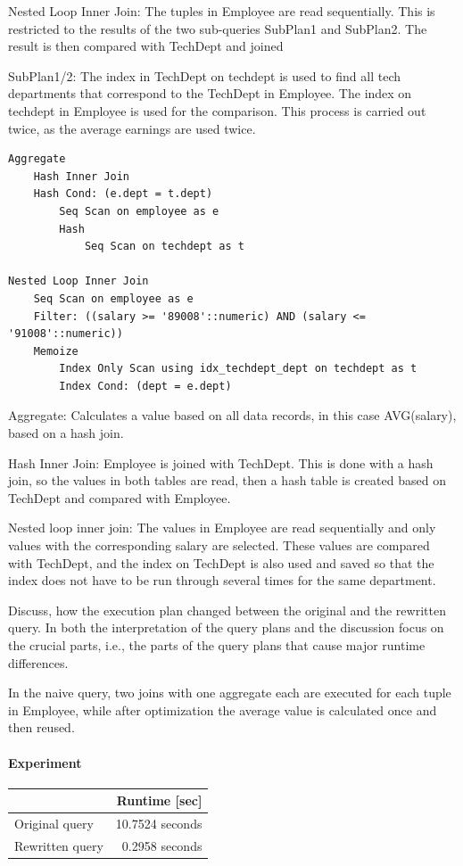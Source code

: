 \documentclass[11pt]{scrartcl}
\begin{document}
Nested Loop Inner Join: The tuples in Employee are read sequentially. This is restricted to the results of the two sub-queries SubPlan1 and SubPlan2. The result is then compared with TechDept and joined

SubPlan1/2: The index in TechDept on techdept is used to find all tech departments that correspond to the TechDept in Employee. The index on techdept in Employee is used for the comparison. This process is carried out twice, as the average earnings are used twice.

{\small
\parskip0pt\begin{verbatim}
Aggregate
	Hash Inner Join
	Hash Cond: (e.dept = t.dept)
		Seq Scan on employee as e
		Hash
			Seq Scan on techdept as t

Nested Loop Inner Join
	Seq Scan on employee as e
	Filter: ((salary >= '89008'::numeric) AND (salary <= '91008'::numeric))
	Memoize
		Index Only Scan using idx_techdept_dept on techdept as t
		Index Cond: (dept = e.dept)
\end{verbatim}}

Aggregate: Calculates a value based on all data records, in this case AVG(salary), based on a hash join.

Hash Inner Join: Employee is joined with TechDept. This is done with a hash join, so the values in both tables are read, then a hash table is created based on TechDept and compared with Employee.

Nested loop inner join: The values in Employee are read sequentially and only values with the corresponding salary are selected. These values are compared with TechDept, and the index on TechDept is also used and saved so that the index does not have to be run through several times for the same department.

Discuss, how the execution plan changed between the original and the rewritten query. In both the interpretation of the query plans and the discussion focus on the crucial parts, i.e., the parts of the query plans that cause major runtime differences.

In the naive query, two joins with one aggregate each are executed for each tuple in Employee, while after optimization the average value is calculated once and then reused.

\paragraph{Experiment}

\begin{table}[H]
  \centering
  \begin{tabular}{l|r}
    & Runtime [sec] \tabularnewline
    \hline
    Original query & 10.7524 seconds \tabularnewline
    Rewritten query & 0.2958 seconds \tabularnewline
  \end{tabular}
\end{table}
\end{document}
